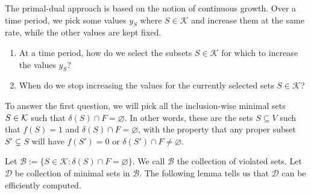 The primal-dual approach is based on the notion of continuous growth. 
Over a time period, we pick some values $y_S$ where $S \in \mathcal{K}$
and increase them at the same rate, while the other values are kept fixed. 
\begin{enumerate}[(1)]
    \item At a time period, how do we select the subsets $S \in \mathcal{K}$ 
    for which to increase the values $y_S$?
    \item When do we stop increasing the values for the currently 
    selected sets $S \in \mathcal{K}$?
\end{enumerate}
To answer the first question, we will pick all the inclusion-wise minimal sets 
$S \in {\cal K}$ such that $\delta(S) \cap F = \varnothing$. In other words, 
these are the sets $S \subseteq V$ such that $f(S) = 1$ and $\delta(S) \cap F 
= \varnothing$, with the property that any proper subset $S' \subsetneq S$ will have 
$f(S') = 0$ or $\delta(S') \cap F \neq \varnothing$. 

Let $\mathcal{B} := \{S \in \mathcal{K} : \delta(S) \cap F = \varnothing\}$. 
We call $\mathcal{B}$ the collection of violated sets. Let
$\mathcal{D}$ be collection of minimal sets in $\mathcal{B}$. The following 
lemma tells us that $\mathcal{D}$ can be efficiently computed. 

